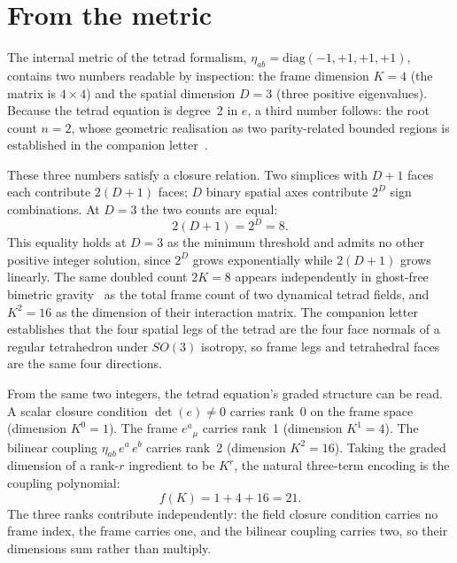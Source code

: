 \documentclass[twocolumn]{iopjournal}
\begin{document}
\section{From the metric}
\label{sec:route1}

The internal metric of the tetrad formalism,
$\eta_{ab} = \mathrm{diag}(-1,+1,+1,+1)$, contains two numbers
readable by inspection: the frame dimension $K = 4$ (the matrix
is $4 \times 4$) and the spatial dimension $D = 3$ (three
positive eigenvalues). Because the tetrad equation is degree~2
in $e$, a third number follows: the root count $n = 2$, whose
geometric realisation as two parity-related bounded regions is
established in the companion letter~\cite{Nelson2026a}.

These three numbers satisfy a closure relation. Two simplices
with $D + 1$ faces each contribute $2(D+1)$ faces; $D$ binary
spatial axes contribute $2^D$ sign combinations. At $D = 3$
the two counts are equal:
\begin{equation}
  2(D + 1) = 2^D = 8.
  \label{eq:closure}
\end{equation}
This equality holds at $D = 3$ as the minimum threshold and
admits no other positive integer solution, since $2^D$ grows
exponentially while $2(D+1)$ grows linearly. The same doubled
count $2K = 8$ appears independently in ghost-free bimetric
gravity~\cite{HR2012a} as the total frame count of two
dynamical tetrad fields, and $K^2 = 16$ as the dimension of
their interaction matrix. The companion
letter~\cite{Nelson2026a} establishes that the four spatial
legs of the tetrad are the four face normals of a regular
tetrahedron under $SO(3)$ isotropy, so frame legs and
tetrahedral faces are the same four directions.

From the same two integers, the tetrad equation's graded
structure can be read. A scalar closure condition
$\det(e) \neq 0$ carries rank~0 on the frame space
(dimension $K^0 = 1$). The frame $e^a{}_\mu$ carries rank~1
(dimension $K^1 = 4$). The bilinear coupling
$\eta_{ab}\,e^a\,e^b$ carries rank~2 (dimension $K^2 = 16$).
Taking the graded dimension of a rank-$r$ ingredient to be
$K^r$, the natural three-term encoding is the coupling
polynomial:
\begin{equation}
  f(K) = 1 + 4 + 16 = 21.
  \label{eq:poly}
\end{equation}
The three ranks contribute independently: the field closure
condition carries no frame index, the frame carries one, and
the bilinear coupling carries two, so their dimensions sum
rather than multiply.
\end{document}
